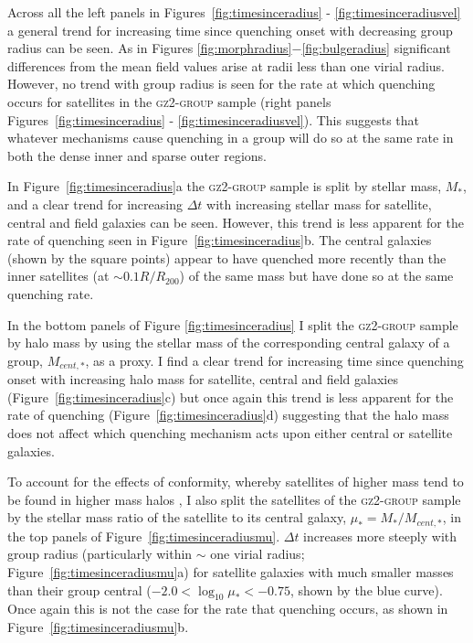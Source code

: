 Across all the left panels in Figures~\ref{fig:timesinceradius} - \ref{fig:timesinceradiusvel} a general trend for increasing time since quenching onset with decreasing group radius can be seen. As in Figures \ref{fig:morphradius}$-$\ref{fig:bulgeradius} significant differences from the mean field values arise at radii less than one virial radius. However, no trend with group radius is seen for the rate at which quenching occurs for satellites in the \textsc{gz2-group} sample (right panels Figures~\ref{fig:timesinceradius} - \ref{fig:timesinceradiusvel}). This suggests that whatever mechanisms cause quenching in a group will do so at the same rate in both the dense inner and sparse outer regions. 

In Figure~\ref{fig:timesinceradius}a the \textsc{gz2-group} sample is split by stellar mass, $M_*$, and a clear trend for increasing $\Delta t$ with increasing stellar mass for satellite, central and field galaxies can be seen. However, this trend is less apparent for the rate of quenching seen in Figure~\ref{fig:timesinceradius}b. The central galaxies (shown by the square points) appear to have quenched more recently than the inner satellites (at $\sim0.1R/R_{200}$) of the same mass but have done so at the same quenching rate. 

In the bottom panels of Figure \ref{fig:timesinceradius} I split the \textsc{gz2-group} sample by halo mass by using the stellar mass of the corresponding central galaxy of a group, $M_{cent,*}$, as a proxy. I find a clear trend for increasing time since quenching onset with increasing halo mass for satellite, central and field galaxies (Figure~\ref{fig:timesinceradius}c) but once again this trend is less apparent for the rate of quenching (Figure~\ref{fig:timesinceradius}d) suggesting that the halo mass does not affect which quenching mechanism acts upon either central or satellite galaxies. 

To account for the effects of conformity, whereby satellites of higher mass tend to be found in higher mass halos \citep{weinmann06, kauffmann13, hearin15, hatfield16}, I also split the satellites of the \textsc{gz2-group} sample by the stellar mass ratio of the satellite to its central galaxy, $\mu_* = M_*/M_{cent,*}$, in the top panels of Figure~\ref{fig:timesinceradiusmu}. $\Delta t $ increases more steeply with group radius (particularly within $\sim$ one virial radius; Figure~\ref{fig:timesinceradiusmu}a) for satellite galaxies with much smaller masses than their group central ($-2.0 < \log_{10}\mu_* < -0.75$, shown by the blue curve). Once again this is not the case for the rate that quenching occurs, as shown in Figure~\ref{fig:timesinceradiusmu}b. 

